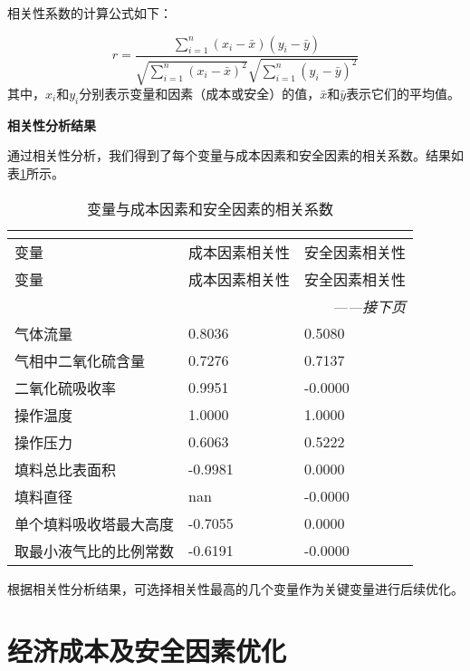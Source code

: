 相关性系数的计算公式如下：

\begin{equation}
	r = \frac{\sum_{i=1}^{n} (x_i - \bar{x})(y_i - \bar{y})}{\sqrt{\sum_{i=1}^{n} (x_i - \bar{x})^2} \sqrt{\sum_{i=1}^{n} (y_i - \bar{y})^2}}
\end{equation}
其中，$x_i$和$y_i$分别表示变量和因素（成本或安全）的值，$\bar{x}$和$\bar{y}$表示它们的平均值。

\textbf{相关性分析结果}

通过相关性分析，我们得到了每个变量与成本因素和安全因素的相关系数。结果如表\ref{tab:correlation}所示。

\begin{longtable}{
		@{} p{} p{} 
		p{} @{}
	}
	\caption{变量与成本因素和安全因素的相关系数} \\
	\label{tab:correlation}\\
	\toprule
	变量 & 成本因素相关性 & 安全因素相关性 \\
	\midrule
	\endfirsthead
	
	\toprule
	变量 & 成本因素相关性 & 安全因素相关性 \\
	\midrule
	\endhead
	
	\midrule
	\multicolumn{3}{r}{\textit{——接下页}} \\
	\endfoot
	
	\bottomrule
	\endlastfoot
	
		气体流量 & 0.8036 & 0.5080 \\
		气相中二氧化硫含量 & 0.7276 & 0.7137 \\
		二氧化硫吸收率 & 0.9951 & -0.0000 \\
		操作温度 & 1.0000 & 1.0000 \\
		操作压力 & 0.6063 & 0.5222 \\
		填料总比表面积 & -0.9981 & 0.0000 \\
		填料直径 & nan & -0.0000 \\
		单个填料吸收塔最大高度 & -0.7055 & 0.0000 \\
		取最小液气比的比例常数 & -0.6191 & -0.0000 \\
\end{longtable}

根据相关性分析结果，可选择相关性最高的几个变量作为关键变量进行后续优化。

\section{经济成本及安全因素优化}

